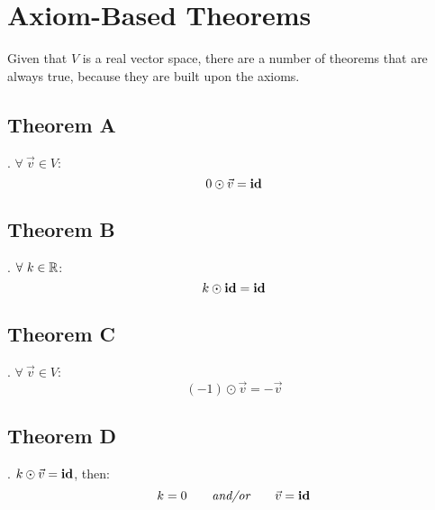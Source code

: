 \section{Axiom-Based Theorems}
Given that $V$ is a real vector space, there are a number of
theorems that are always true, because they are built upon the axioms.

\subsection*{Theorem A}
.
$\forall~\vec{v} \in V$:
\[
  0 \odot \vec{v} = \textbf{id}
\]

\subsection*{Theorem B}
.
$\forall~k \in \mathbb{R}$:
\[
  k \odot \textbf{id} = \textbf{id}
\]

\subsection*{Theorem C}
.
$\forall~\vec{v} \in V$:
\[
  (-1) \odot \vec{v} = -\vec{v}
\]

\subsection*{Theorem D}
.
 $k \odot \vec{v} = \textbf{id}$, then:
\[
  k = 0\qquad\textit{and/or}\qquad\vec{v} = \textbf{id}
\]